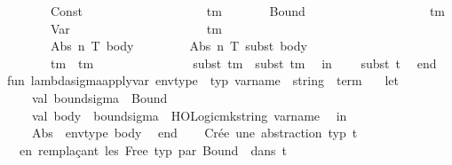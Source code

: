 \begin{isabellebody}
\ \ \ \ \ \ {\isacharbar}{\kern0pt}\ Const\ {\isacharunderscore}{\kern0pt}\ \ \ \ \ \ \ \ \ \ \ \ \ \ \ \ \ \ {\isacharequal}{\kern0pt}{\isachargreater}{\kern0pt}\ tm\isanewline
\ \ \ \ \ \ {\isacharbar}{\kern0pt}\ Bound\ {\isacharunderscore}{\kern0pt}\ \ \ \ \ \ \ \ \ \ \ \ \ \ \ \ \ \ {\isacharequal}{\kern0pt}{\isachargreater}{\kern0pt}\ tm\isanewline
\ \ \ \ \ \ {\isacharbar}{\kern0pt}\ Var\ {\isacharunderscore}{\kern0pt}\ \ \ \ \ \ \ \ \ \ \ \ \ \ \ \ \ \ \ \ {\isacharequal}{\kern0pt}{\isachargreater}{\kern0pt}\ tm\isanewline
\ \ \ \ \ \ {\isacharbar}{\kern0pt}\ Abs\ {\isacharparenleft}{\kern0pt}n{\isacharcomma}{\kern0pt}\ T{\isacharcomma}{\kern0pt}\ body{\isacharparenright}{\kern0pt}\ \ \ \ \ \ \ \ {\isacharequal}{\kern0pt}{\isachargreater}{\kern0pt}\ Abs\ {\isacharparenleft}{\kern0pt}n{\isacharcomma}{\kern0pt}\ T{\isacharcomma}{\kern0pt}\ subst\ body{\isacharparenright}{\kern0pt}\isanewline
\ \ \ \ \ \ {\isacharbar}{\kern0pt}\ tm{}\ {\isachardollar}{\kern0pt}\ tm{}\ \ \ \ \ \ \ \ \ \ \ \ \ \ \ {\isacharequal}{\kern0pt}{\isachargreater}{\kern0pt}\ subst\ tm{}\ {\isachardollar}{\kern0pt}\ subst\ tm{}\isanewline
\ \ in\isanewline
\ \ \ \ subst\ t\isanewline
\ \ end\isanewline
\isanewline
fun\ lambda{\isacharunderscore}{\kern0pt}sigma{\isacharunderscore}{\kern0pt}apply{\isacharunderscore}{\kern0pt}var\ {\isacharparenleft}{\kern0pt}env{\isacharunderscore}{\kern0pt}type\ {\isacharcolon}{\kern0pt}\ typ{\isacharparenright}{\kern0pt}\ {\isacharparenleft}{\kern0pt}var{\isacharunderscore}{\kern0pt}name\ {\isacharcolon}{\kern0pt}\ string{\isacharparenright}{\kern0pt}\ {\isacharcolon}{\kern0pt}\ term\ {\isacharequal}{\kern0pt}\isanewline
\ \ let\isanewline
\ \ \ \ val\ bound{\isacharunderscore}{\kern0pt}sigma\ {\isacharequal}{\kern0pt}\ Bound\ {}\isanewline
\ \ \ \ val\ body\ {\isacharequal}{\kern0pt}\ bound{\isacharunderscore}{\kern0pt}sigma\ {\isachardollar}{\kern0pt}\ HOLogic{\isachardot}{\kern0pt}mk{\isacharunderscore}{\kern0pt}string\ var{\isacharunderscore}{\kern0pt}name\isanewline
\ \ in\isanewline
\ \ \ \ Abs\ {\isacharparenleft}{\kern0pt}{\isachardoublequote}{\kern0pt}{\isasymsigma}{\isachardoublequote}{\kern0pt}{\isacharcomma}{\kern0pt}\ env{\isacharunderscore}{\kern0pt}type{\isacharcomma}{\kern0pt}\ body{\isacharparenright}{\kern0pt}\isanewline
\ \ end\isanewline
\isanewline
{\isacharparenleft}{\kern0pt}{\isacharasterisk}{\kern0pt}\ \isanewline
\ \ Crée\ une\ abstraction\ {\isasymlambda}{\isasymsigma}{\isacharcolon}{\kern0pt}typ{\isachardot}{\kern0pt}\ t\isanewline
\ \ en\ remplaçant\ les\ Free{\isacharparenleft}{\kern0pt}{\isachardoublequote}{\kern0pt}{\isasymsigma}{\isachardoublequote}{\kern0pt}{\isacharcomma}{\kern0pt}\ typ{\isacharparenright}{\kern0pt}\ par\ Bound\ {}\ dans\ t\isanewline

\end{isabellebody}
